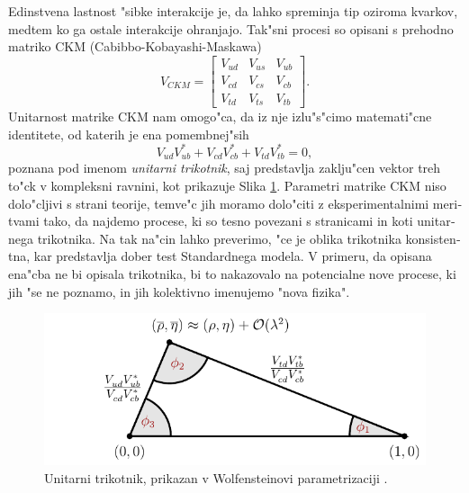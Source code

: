 \begin{otherlanguage}{slovene}
Edinstvena lastnost "sibke interakcije je, da lahko spreminja tip oziroma kvarkov, medtem ko ga ostale interakcije ohranjajo. Tak"sni procesi so opisani s prehodno matriko CKM (Cabibbo-Kobayashi-Maskawa) \cite{cabibbo1963unitary,kobayashi1973cp}
\begin{equation}
V_{CKM} = \begin{bmatrix}
    V_{ud} & V_{us} & V_{ub}\\
	V_{cd} & V_{cs} & V_{cb}\\
	V_{td} & V_{ts} & V_{tb}
\end{bmatrix}.
\end{equation}
Unitarnost matrike CKM nam omogo"ca, da iz nje izlu"s"cimo matemati"cne identitete, od katerih je ena pomembnej"sih
\begin{equation}
V_{ud}V_{ub}^* + V_{cd}V_{cb}^* + V_{td}V_{tb}^* = 0,
\end{equation}
poznana pod imenom \textit{unitarni trikotnik}, saj predstavlja zaklju"cen vektor treh to"ck v kompleksni ravnini, kot prikazuje Slika \ref{fig:ut_si}. Parametri matrike CKM niso dolo"cljivi s strani teorije, temve"c jih moramo dolo"citi z eksperimentalnimi meritvami tako, da najdemo procese, ki so tesno povezani s stranicami in koti unitarnega trikotnika. Na tak na"cin lahko preverimo, "ce je oblika trikotnika konsistentna, kar predstavlja dober test Standardnega modela. V primeru, da opisana ena"cba ne bi opisala trikotnika, bi to nakazovalo na potencialne nove procese, ki jih "se ne poznamo, in jih kolektivno imenujemo "nova fizika". 
\begin{figure}[H]
\centering
\includegraphics[scale=1]{texfig/UT_Triangle}
	\captionsetup{width=0.8\linewidth}
\caption{Unitarni trikotnik, prikazan v Wolfensteinovi parametrizaciji \cite{PhysRevLett.51.1945}.}
\label{fig:ut_si}
\end{figure}


\end{otherlanguage}
